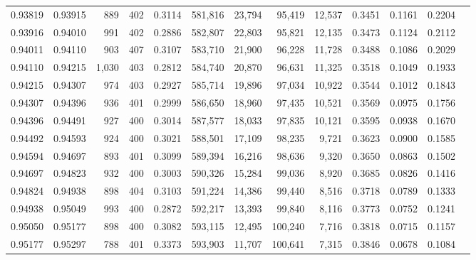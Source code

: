 \begin{tabular}{rrrrrrrrrrrrr}
0.93819 & 0.93915 &   889 & 402 &                                     0.3114 & 581,816 &  23,794 &  95,419 &  12,537 & 0.3451 & 0.1161 & 0.2204 \\
0.93916 & 0.94010 &   991 & 402 &                                     0.2886 & 582,807 &  22,803 &  95,821 &  12,135 & 0.3473 & 0.1124 & 0.2112 \\
0.94011 & 0.94110 &   903 & 407 &                                     0.3107 & 583,710 &  21,900 &  96,228 &  11,728 & 0.3488 & 0.1086 & 0.2029 \\
0.94110 & 0.94215 & 1,030 & 403 &                                     0.2812 & 584,740 &  20,870 &  96,631 &  11,325 & 0.3518 & 0.1049 & 0.1933 \\
0.94215 & 0.94307 &   974 & 403 &                                     0.2927 & 585,714 &  19,896 &  97,034 &  10,922 & 0.3544 & 0.1012 & 0.1843 \\
0.94307 & 0.94396 &   936 & 401 &                                     0.2999 & 586,650 &  18,960 &  97,435 &  10,521 & 0.3569 & 0.0975 & 0.1756 \\
0.94396 & 0.94491 &   927 & 400 &                                     0.3014 & 587,577 &  18,033 &  97,835 &  10,121 & 0.3595 & 0.0938 & 0.1670 \\
0.94492 & 0.94593 &   924 & 400 &                                     0.3021 & 588,501 &  17,109 &  98,235 &   9,721 & 0.3623 & 0.0900 & 0.1585 \\
0.94594 & 0.94697 &   893 & 401 &                                     0.3099 & 589,394 &  16,216 &  98,636 &   9,320 & 0.3650 & 0.0863 & 0.1502 \\
0.94697 & 0.94823 &   932 & 400 &                                     0.3003 & 590,326 &  15,284 &  99,036 &   8,920 & 0.3685 & 0.0826 & 0.1416 \\
0.94824 & 0.94938 &   898 & 404 &                                     0.3103 & 591,224 &  14,386 &  99,440 &   8,516 & 0.3718 & 0.0789 & 0.1333 \\
0.94938 & 0.95049 &   993 & 400 &                                     0.2872 & 592,217 &  13,393 &  99,840 &   8,116 & 0.3773 & 0.0752 & 0.1241 \\
0.95050 & 0.95177 &   898 & 400 &                                     0.3082 & 593,115 &  12,495 & 100,240 &   7,716 & 0.3818 & 0.0715 & 0.1157 \\
0.95177 & 0.95297 &   788 & 401 &                                     0.3373 & 593,903 &  11,707 & 100,641 &   7,315 & 0.3846 & 0.0678 & 0.1084 \\

\end{tabular}
